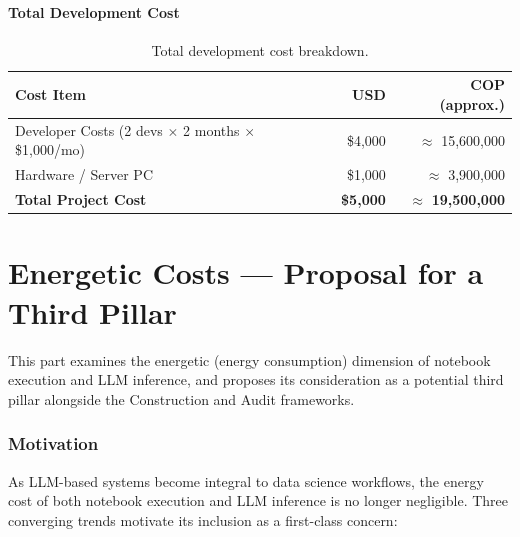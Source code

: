 \documentclass[11pt, a4paper]{article}
\begin{document}
\subsection*{Total Development Cost}

\begin{table}[H]
  \centering
  \caption{Total development cost breakdown.}
  \label{tab:dev-cost}
  \renewcommand{\arraystretch}{1.3}
  \begin{tabularx}{\textwidth}{l r r}
    \toprule
    \textbf{Cost Item} & \textbf{USD} & \textbf{COP (approx.)} \\
    \midrule
    Developer Costs (2 devs $\times$ 2 months $\times$ \$1{,}000/mo)
      & \$4{,}000 & $\approx$ 15{,}600{,}000 \\
    Hardware / Server PC & \$1{,}000 & $\approx$ 3{,}900{,}000 \\
    \midrule
    \textbf{Total Project Cost}
      & \textbf{\$5{,}000} & $\approx$ \textbf{19{,}500{,}000} \\
    \bottomrule
  \end{tabularx}
\end{table}

\part{Energetic Costs — Proposal for a Third Pillar}

This part examines the energetic (energy consumption) dimension of notebook
execution and LLM inference, and proposes its consideration as a potential
third pillar alongside the Construction and Audit frameworks.

\section{Motivation}

As LLM-based systems become integral to data science workflows, the energy
cost of both notebook execution and LLM inference is no longer negligible.
Three converging trends motivate its inclusion as a first-class concern:
\end{document}
